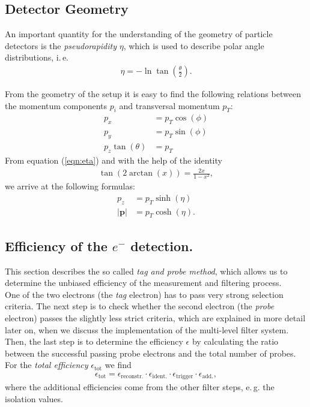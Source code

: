 \documentclass[twocolumn,
			   showpacs,%
               nofootinbib,
               aps,%
               prd,
               notitlepage,
               showkeys,
               10pt]{revtex4-1}
\begin{document}
\subsection{Detector Geometry}
An important quantity for the understanding of the geometry of particle detectors is the \textit{pseudorapidity} $\eta$, which is used to describe polar angle distributions, i.\,e.
\begin{align}
\eta = -\ln \tan(\frac{\theta}{2}).	\label{eqn:eta}
\end{align}

From the geometry of the setup it is easy to find the following relations between the momentum components $p_i$ and transversal momentum $p_T$:
\begin{align}
	p_x &= p_T \cos(\phi)\\
	p_y &= p_T \sin(\phi)\\
	p_z \tan(\theta) &= p_T
\end{align}
From equation (\ref{eqn:eta}) and with the help of the identity
\begin{align*}
\tan(2\arctan(x)) = \frac{2x}{1 - x^2},
\end{align*} 
we arrive at the following formulas:
\begin{align}
	p_z &= p_T\sinh(\eta)\\
	\left|\mathbf{p}\right| &= p_T \cosh(\eta).
\end{align}


\subsection{Efficiency of the $e^-$ detection.}
This section describes the so called \textit{tag and probe method}, which allows us to determine the unbiased efficiency of the measurement and filtering process.\\
One of the two electrons (the \textit{tag} electron) has to pass very strong selection criteria. The next step is to check whether the second electron (the \textit{probe} electron) passes the slightly less strict criteria, which are explained in more detail later on, when we discuss the implementation of the multi-level filter system. \\
Then, the last step is to determine the efficiency $\epsilon$ by calculating the ratio between the successful passing probe electrons and the total number of probes.\\
For the \textit{total efficiency} $\epsilon_{\text{tot}}$ we find 
\begin{align}
	\epsilon_{\text{tot}} = \epsilon_{\text{reconstr.}} \cdot \epsilon_{\text{ident.}} \cdot \epsilon_{\text{trigger}} \cdot \epsilon_{\text{add.}},
\end{align}
 where the additional efficiencies come from the other filter steps, e.\,g. the isolation values. \\
 
\end{document}
